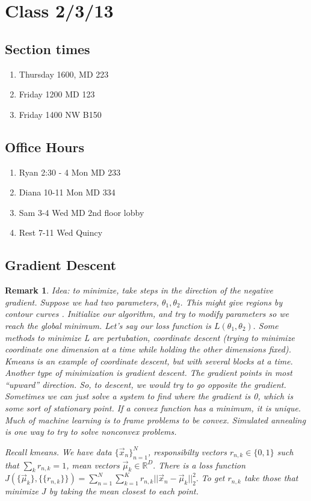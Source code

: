 \documentclass{amsart}
\newtheorem{rem}[subsubsection]{Remark}
\begin{document}
\section{Class 2/3/13}
\subsection{Section times}
\begin{enumerate}
\item Thursday 1600, MD 223
\item Friday 1200 MD 123
\item Friday 1400 NW B150
\end {enumerate}

\subsection{Office Hours}
\begin{enumerate}
\item Ryan 2:30 - 4 Mon MD 233
\item Diana 10-11 Mon MD 334
\item Sam 3-4 Wed MD 2nd floor lobby
\item Rest 7-11 Wed Quincy
\end {enumerate}

\subsection{Gradient Descent}

\begin{rem}
Idea: to minimize, take steps in the direction of the negative gradient. Suppose we had two parameters, $\theta_1, \theta_2.$ This might give regions by contour curves . Initialize our algorithm, and try to modify parameters so we reach the global minimum. Let's say our loss function is $L(\theta_1,\theta_2).$ Some methods to minimize L are pertubation, coordinate descent (trying to minimize coordinate one dimension at a time while holding the other dimensions fixed). Kmeans is an example of coordinate descent, but with several blocks at a time. Another type of minimization is gradient descent. The gradient points in most ``upward'' direction. So, to descent, we would try to go opposite the gradient. Sometimes we can just solve a system to find where the gradient is 0, which is some sort of stationary point. If a convex function has a minimum, it is unique. Much of machine learning is to frame problems to be convex. Simulated annealing is one way to try to solve nonconvex problems.

Recall kmeans. We have data $\{\vec x_n\}_{n=1}^N$, responsibilty vectors $r_{n,k} \in \{0,1\}$ such that $\sum_k r_{n,k}=1$, mean vectors $\vec \mu_k \in \mathbb R^D.$ There is a loss function $J(\{\vec \mu_k\},\{ \{r_{n,k}\}\})=\sum_{n=1}^N \sum_{k=1}^K r_{n,k} ||\vec x_n - \vec \mu_k||_2^2.$ To get $r_{n,k}$ take those that minimize $J$ by taking the mean closest to each point.
\end{rem}
\end{document}
